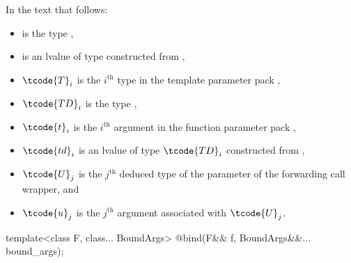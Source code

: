 \pnum
In the text that follows:

\begin{itemize}
\item {} is the type ,
\item {} is an lvalue of type  constructed from ,
\item $\tcode{T}_i$ is the $i^\text{th}$ type in the template parameter pack ,
\item $\tcode{TD}_i$ is the type ,
\item $\tcode{t}_i$ is the $i^\text{th}$ argument in the function parameter pack ,
\item $\tcode{td}_i$ is an lvalue of type $\tcode{TD}_i$ constructed from ,
\item $\tcode{U}_j$ is the $j^\text{th}$ deduced type of the  parameter
  of the forwarding call wrapper, and
\item $\tcode{u}_j$ is the $j^\text{th}$ argument associated with $\tcode{U}_j$.
\end{itemize}

%
\begin{itemdecl}
template<class F, class... BoundArgs>
  @\unspec@ bind(F&& f, BoundArgs&&... bound_args);
\end{itemdecl}

